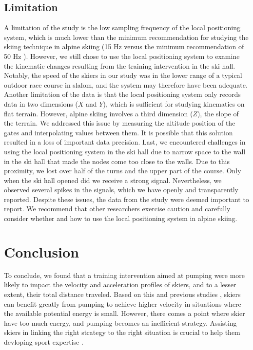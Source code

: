 \documentclass{article}
\begin{document}
\subsection{Limitation}
A limitation of the study is the low sampling frequency of the local positioning system, which is much lower than the minimum recommendation for studying the skiing technique in alpine skiing (15 Hz versus the minimum recommendation of 50 Hz \cite{federolf_quantifying_2012}). However, we still chose to use the local positioning system to examine the kinematic changes resulting from the training intervention in the ski hall. Notably, the speed of the skiers in our study was in the lower range of a typical outdoor race course in slalom, and the system may therefore have been adequate. Another limitation of the data is that the local positioning system only records data in two dimensions ($X$ and $Y$), which is sufficient for studying kinematics on flat terrain. However, alpine skiing involves a third dimension ($Z$), the slope of the terrain. We addressed this issue by measuring the altitude position of the gates and interpolating values between them. It is possible that this solution resulted in a loss of important data precision. Last, we encountered challenges in using the local positioning system in the ski hall due to narrow space to the wall in the ski hall that made the nodes come too close to the walls. Due to this proximity, we lost over half of the turns and the upper part of the course. Only when the ski hall opened did we receive a strong signal. Nevertheless, we observed several spikes in the signals, which we have openly and transparently reported. Despite these issues, the data from the study were deemed important to report.  We recommend that other researchers exercise caution and carefully consider whether and how to use the local positioning system in alpine skiing.

\section{Conclusion}
To conclude, we found that a training intervention aimed at pumping were more likely to impact the velocity and acceleration profiles of skiers, and to a lesser extent, their total distance traveled. Based on this and previous studies \cite{christian_magelssen_reinforcement_2024}, skiers can benefit greatly from pumping to achieve higher velocity in situations where the available potential energy is small. However, there comes a point where skier have too much energy, and pumping becomes an inefficient strategy. Assisting skiers in linking the right strategy to the right situation is crucial to help them devloping sport expertise \cite{krakauer_motor_2019}.
\end{document}
